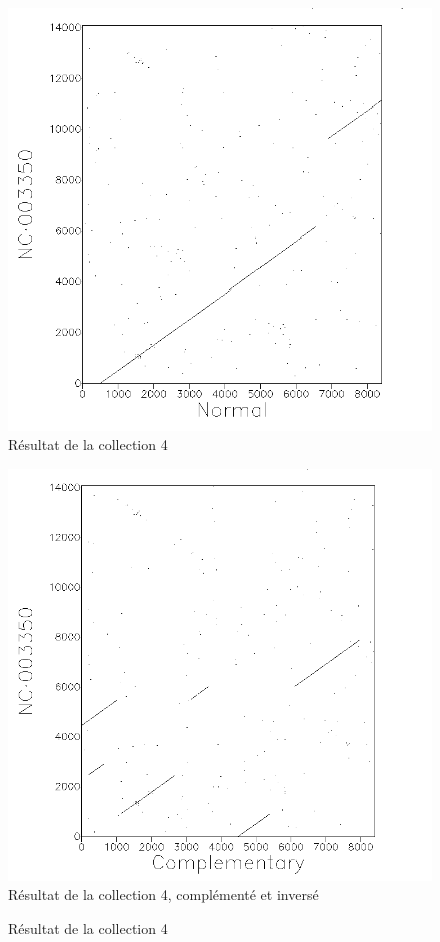 \begin{figure}[!ht]
	\begin{minipage}[r]{.46\linewidth}
		\begin{center}
		\includegraphics[scale= 0.4]{../res/cible4.png}
		Résultat de la collection 4
	\end{center}
\end{minipage} \hfill
\begin{minipage}[c]{.46 \linewidth}
	\begin{center}
			\includegraphics[scale= 0.4]{../res/cible4-ic.png}
			Résultat de la collection 4, complémenté et inversé
		\end{center}
	\end{minipage}
	\caption{Résultat de la collection 4}
\end{figure}

